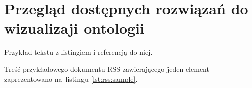 \chapter{Przegląd dostępnych rozwiązań do wizualizaji ontologii}

Przykład tekstu z listingiem i referencją do niej.

Treść przykładowego dokumentu RSS 
zawierającego jeden element zaprezentowano na~listingu \ref{lst:rss:sample}.




